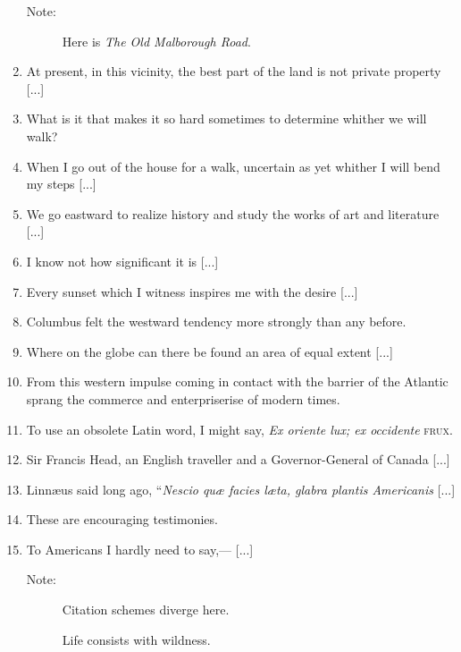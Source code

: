 \documentclass[twoside,openright,10pt]{memoir} %
\begin{document}
\begin{enumerate}
\begin{description}
  \item[Note:] Here is \emph{The Old Malborough Road}.
  \end{description}
\item At present, in this vicinity, the best part of the land is not private property [...]
\item What is it that makes it so hard sometimes to determine whither we will walk?
\item When I go out of the house for a walk, uncertain as yet whither I will bend my steps [...]
\item We go eastward to realize history and study the works of art and literature [...]
\item I know not how significant it is [...]
\item Every sunset which I witness inspires me with the desire [...]
\item Columbus felt the westward tendency more strongly than any before.  
\item Where on the globe can there be found an area of equal extent [...]
\item From this western impulse coming in contact with the barrier of the Atlantic sprang the commerce and enterpriserise of modern times.
\item To use an obsolete Latin word, I might say, \emph{Ex oriente lux; ex occidente} \textsc{frux}.  
\item Sir Francis Head, an English traveller and a Governor-General of Canada [...]
\item Linnæus said long ago, “\emph{Nescio quæ facies læta, glabra plantis Americanis} [...]
\item These are encouraging testimonies.
\item To Americans I hardly need to say,— [...]
\begin{description}
   \item[Note:] Citation schemes diverge here.
   
   Life consists with wildness. \setcounter{count}{33} \EBGaramond{}\textlangle\normalfont {} \thecount \EBGaramond{}\textrangle \normalfont
\end{description}


\end{enumerate}
\end{document}
